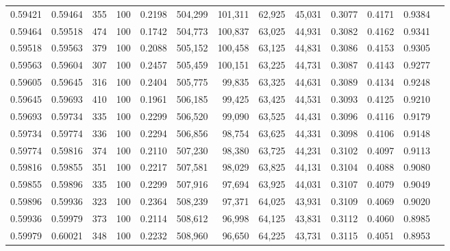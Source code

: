 \begin{tabular}{rrrrrrrrrrrrr}
0.59421 & 0.59464 &   355 & 100 &                                     0.2198 & 504,299 & 101,311 &  62,925 &  45,031 & 0.3077 & 0.4171 & 0.9384 \\
0.59464 & 0.59518 &   474 & 100 &                                     0.1742 & 504,773 & 100,837 &  63,025 &  44,931 & 0.3082 & 0.4162 & 0.9341 \\
0.59518 & 0.59563 &   379 & 100 &                                     0.2088 & 505,152 & 100,458 &  63,125 &  44,831 & 0.3086 & 0.4153 & 0.9305 \\
0.59563 & 0.59604 &   307 & 100 &                                     0.2457 & 505,459 & 100,151 &  63,225 &  44,731 & 0.3087 & 0.4143 & 0.9277 \\
0.59605 & 0.59645 &   316 & 100 &                                     0.2404 & 505,775 &  99,835 &  63,325 &  44,631 & 0.3089 & 0.4134 & 0.9248 \\
0.59645 & 0.59693 &   410 & 100 &                                     0.1961 & 506,185 &  99,425 &  63,425 &  44,531 & 0.3093 & 0.4125 & 0.9210 \\
0.59693 & 0.59734 &   335 & 100 &                                     0.2299 & 506,520 &  99,090 &  63,525 &  44,431 & 0.3096 & 0.4116 & 0.9179 \\
0.59734 & 0.59774 &   336 & 100 &                                     0.2294 & 506,856 &  98,754 &  63,625 &  44,331 & 0.3098 & 0.4106 & 0.9148 \\
0.59774 & 0.59816 &   374 & 100 &                                     0.2110 & 507,230 &  98,380 &  63,725 &  44,231 & 0.3102 & 0.4097 & 0.9113 \\
0.59816 & 0.59855 &   351 & 100 &                                     0.2217 & 507,581 &  98,029 &  63,825 &  44,131 & 0.3104 & 0.4088 & 0.9080 \\
0.59855 & 0.59896 &   335 & 100 &                                     0.2299 & 507,916 &  97,694 &  63,925 &  44,031 & 0.3107 & 0.4079 & 0.9049 \\
0.59896 & 0.59936 &   323 & 100 &                                     0.2364 & 508,239 &  97,371 &  64,025 &  43,931 & 0.3109 & 0.4069 & 0.9020 \\
0.59936 & 0.59979 &   373 & 100 &                                     0.2114 & 508,612 &  96,998 &  64,125 &  43,831 & 0.3112 & 0.4060 & 0.8985 \\
0.59979 & 0.60021 &   348 & 100 &                                     0.2232 & 508,960 &  96,650 &  64,225 &  43,731 & 0.3115 & 0.4051 & 0.8953 \\

\end{tabular}
